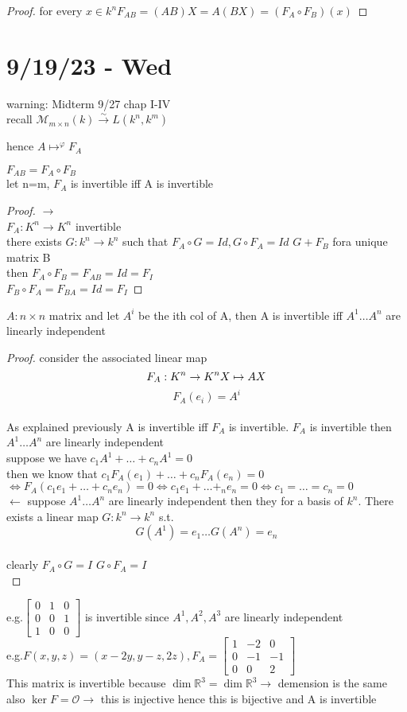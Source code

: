 \documentclass{article}
\newcommand{\R}{\mathbb{R}}
\newcommand\m[1]{\begin{bmatrix}#1\end{bmatrix}}
\newcommand{\mn}{m \times n}
\newcommand{\oh}{\mathcal{O}}
\newcommand{\calm}{\mathcal{M}}
\newcommand{\li}{linearly independent }
\begin{document}
\begin{proof}
    for every $x \in k^n$$F_{AB}=(AB)X=A(BX)=(F_A \circ F_B)(x)$
\end{proof}
\section{9/19/23 - Wed}
warning: Midterm 9/27  chap I-IV
\\
recall $\calm_{\mn}(k) \xrightarrow{\sim} L(k^n,k^m)$

hence $A \mapsto^{\varphi} F_A$

$F_{AB}=F_A\circ F_B$\\
let n=m, $F_A$ is invertible iff A is invertible
\\
\begin{proof}
    $\to $\\
    $F_A:K^n \to K^n  $ invertible\\
    there exists $G:k^n\to k^n$ such that $F_A \circ G=Id, G \circ F_A=Id$
$G+F_B$ fora unique matrix B\\
then $F_A \circ F_B=F_{AB}=Id=F_I$\\
$F_B\circ F_A=F_{BA}=Id=F_I$




\end{proof}
\begin{theorem}
    $A: n \times n $ matrix and let $A^i$ be the ith col of A, then A is invertible iff $A^1\dots A^n$ are \li
\end{theorem}


\begin{proof}
    consider the associated linear map $$F_A:K^n \to K^n \\ X \mapsto AX$$
    $$F_A(e_i)=A^i$$\\
As explained previously A is invertible iff $F_A$ is invertible. 
$F_A$ is invertible then $A^1\dots A^n$ are \li
\\suppose we have $c_1A^1+\dots+c_nA^1=0$\\
then we know that $c_1F_A(e_1)+\dots+c_nF_A(e_n)=0$
$\iff F_A(c_1e_1+\dots+c_ne_n)=0\iff c_1e_1+\dots+_ne_n=0\iff c_1=\dots=c_n=0$\\
$\leftarrow$
suppose $A^1\dots A^n$ are \li then they for a basis of $k^n$. There exists a linear map $G:k^n \to k^n$ s.t. $$G(A^1)=e_1 \dots G(A^n)=e_n$$\\clearly $F_A \circ G=I$ $G \circ F_A=I$\\\end{proof}
e.g.$\m{0&1&0\\0&0&1\\1&0&0}$ is invertible since $A^1,A^2,A^3$ are \li\\
e.g.${F(x,y,z)=(x-2y,y-z,2z)}, F_A=\m{1&-2&0\\0&-1&-1\\0&0&2}$
\\This matrix is invertible because $\dim \R^3 =\dim \R^3 \to $ demension is the same also $\ker F=\oh \to $ this is injective hence this is bijective and A is invertible\\
\end{document}
